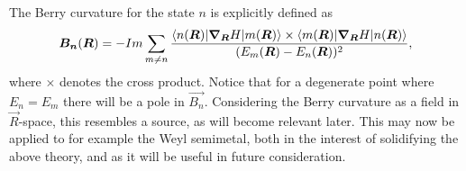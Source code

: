 The Berry curvature for the state $n$ is explicitly defined as~\cite{berryQuantalPhaseFactors1984}
\begin{equation}
  \bm{B_n}(\bm{R}) =
  -Im \sum_{m\neq n}
  \frac{
    \braket{n(\bm{R}) | \bm{\nabla}_{\bm{R}} H | m(\bm{R}) }
    \times
    \braket{m(\bm{R}) | \bm{\nabla}_{\bm{R}} H | n(\bm{R}) }
  }{
    (E_m(\bm{R}) - E_n(\bm{R}))^2
  },
\end{equation}
where $\times $ denotes the cross product.
Notice that for a degenerate point where $E_n = E_m$ there will be a pole in $\vec{B_n}$.
Considering the Berry curvature as a field in $\vec{R}$-space, this resembles a source, as will become relevant later.
This may now be applied to for example the Weyl semimetal, both in the interest of solidifying the above theory, and as it will be useful in future consideration.

